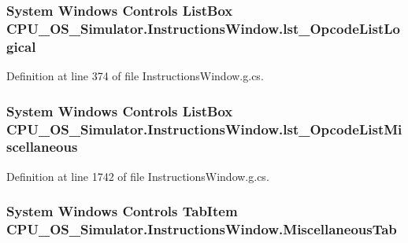 \subsubsection[{lst\+\_\+\+Opcode\+List\+Logical}]{\setlength{\rightskip}{0pt plus 5cm}System Windows Controls List\+Box C\+P\+U\+\_\+\+O\+S\+\_\+\+Simulator.\+Instructions\+Window.\+lst\+\_\+\+Opcode\+List\+Logical\hspace{0.3cm}{\ttfamily [package]}}\label{class_c_p_u___o_s___simulator_1_1_instructions_window_a61ee2cb0ba7197963b1138848778cd3c}


Definition at line 374 of file Instructions\+Window.\+g.\+cs.

\hypertarget{class_c_p_u___o_s___simulator_1_1_instructions_window_a3ac59be147d3323d2b485551b3a3640a}{}
\subsubsection[{lst\+\_\+\+Opcode\+List\+Miscellaneous}]{\setlength{\rightskip}{0pt plus 5cm}System Windows Controls List\+Box C\+P\+U\+\_\+\+O\+S\+\_\+\+Simulator.\+Instructions\+Window.\+lst\+\_\+\+Opcode\+List\+Miscellaneous\hspace{0.3cm}{\ttfamily [package]}}\label{class_c_p_u___o_s___simulator_1_1_instructions_window_a3ac59be147d3323d2b485551b3a3640a}


Definition at line 1742 of file Instructions\+Window.\+g.\+cs.

\hypertarget{class_c_p_u___o_s___simulator_1_1_instructions_window_ab7e1bbdc8bb2830d39fb9a4339aa27f2}{}
\subsubsection[{Miscellaneous\+Tab}]{\setlength{\rightskip}{0pt plus 5cm}System Windows Controls Tab\+Item C\+P\+U\+\_\+\+O\+S\+\_\+\+Simulator.\+Instructions\+Window.\+Miscellaneous\+Tab\hspace{0.3cm}{\ttfamily [package]}}\label{class_c_p_u___o_s___simulator_1_1_instructions_window_ab7e1bbdc8bb2830d39fb9a4339aa27f2}


